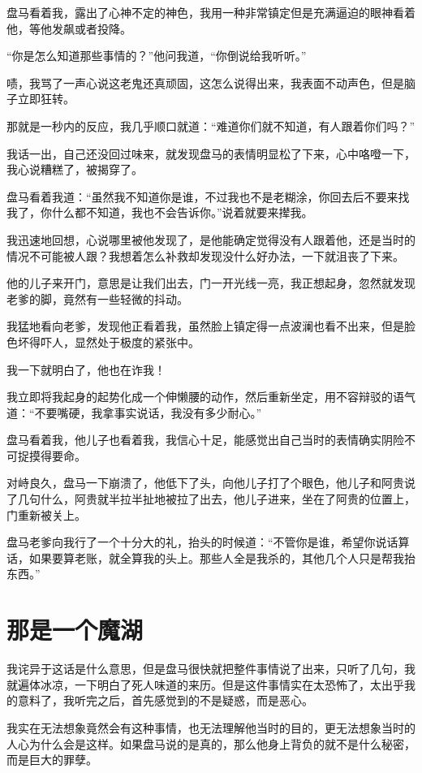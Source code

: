 盘马看着我，露出了心神不定的神色，我用一种非常镇定但是充满逼迫的眼神看着他，等他发飙或者投降。

“你是怎么知道那些事情的？”他问我道，“你倒说给我听听。”

啧，我骂了一声心说这老鬼还真顽固，这怎么说得出来，我表面不动声色，但是脑子立即狂转。

那就是一秒内的反应，我几乎顺口就道：“难道你们就不知道，有人跟着你们吗？”

我话一出，自己还没回过味来，就发现盘马的表情明显松了下来，心中咯噔一下，我心说糟糕了，被揭穿了。

盘马看着我道：“虽然我不知道你是谁，不过我也不是老糊涂，你回去后不要来找我了，你什么都不知道，我也不会告诉你。”说着就要来撵我。

我迅速地回想，心说哪里被他发现了，是他能确定觉得没有人跟着他，还是当时的情况不可能被人跟？我想着怎么补救却发现没什么好办法，一下就沮丧了下来。

他的儿子来开门，意思是让我们出去，门一开光线一亮，我正想起身，忽然就发现老爹的脚，竟然有一些轻微的抖动。

我猛地看向老爹，发现他正看着我，虽然脸上镇定得一点波澜也看不出来，但是脸色坏得吓人，显然处于极度的紧张中。

我一下就明白了，他也在诈我！

我立即将我起身的起势化成一个伸懒腰的动作，然后重新坐定，用不容辩驳的语气道：“不要嘴硬，我拿事实说话，我没有多少耐心。”

盘马看着我，他儿子也看着我，我信心十足，能感觉出自己当时的表情确实阴险不可捉摸得要命。

对峙良久，盘马一下崩溃了，他低下了头，向他儿子打了个眼色，他儿子和阿贵说了几句什么，阿贵就半拉半扯地被拉了出去，他儿子进来，坐在了阿贵的位置上，门重新被关上。

盘马老爹向我行了一个十分大的礼，抬头的时候道：“不管你是谁，希望你说话算话，如果要算老账，就全算我的头上。那些人全是我杀的，其他几个人只是帮我抬东西。”

\chapter{那是一个魔湖}

我诧异于这话是什么意思，但是盘马很快就把整件事情说了出来，只听了几句，我就遍体冰凉，一下明白了死人味道的来历。但是这件事情实在太恐怖了，太出乎我的意料了，我听完之后，首先感觉到的不是疑惑，而是恶心。

我实在无法想象竟然会有这种事情，也无法理解他当时的目的，更无法想象当时的人心为什么会是这样。如果盘马说的是真的，那么他身上背负的就不是什么秘密，而是巨大的罪孽。

